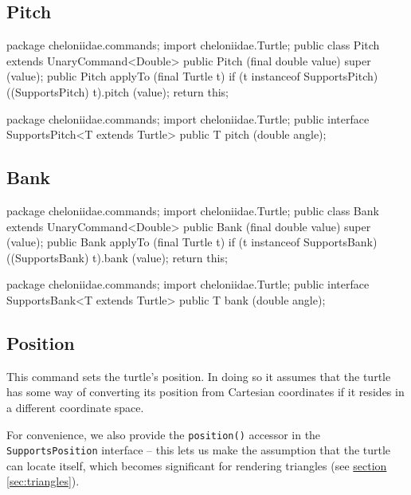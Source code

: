 \documentclass{report}
\newcommand{\Ref}[2]{\hyperref[#2]{#1 \ref*{#2}}}
\begin{document}
\subsection {Pitch} \label{sec:pitch}
\begin{javacode}
package cheloniidae.commands;
import cheloniidae.Turtle;
public class Pitch extends UnaryCommand<Double> {
  public Pitch (final double value) {super (value);}
  public Pitch applyTo (final Turtle t) {
    if (t instanceof SupportsPitch) ((SupportsPitch) t).pitch (value);
    return this;
  }
}
\end{javacode}

\begin{javacode}
package cheloniidae.commands;
import cheloniidae.Turtle;
public interface SupportsPitch<T extends Turtle> {
  public T pitch (double angle);
}
\end{javacode}

\subsection {Bank} \label{sec:bank}
\begin{javacode}
package cheloniidae.commands;
import cheloniidae.Turtle;
public class Bank extends UnaryCommand<Double> {
  public Bank (final double value) {super (value);}
  public Bank applyTo (final Turtle t) {
    if (t instanceof SupportsBank) ((SupportsBank) t).bank (value);
    return this;
  }
}
\end{javacode}

\begin{javacode}
package cheloniidae.commands;
import cheloniidae.Turtle;
public interface SupportsBank<T extends Turtle> {
  public T bank (double angle);
}
\end{javacode}

\subsection {Position} \label{sec:position}
        This command sets the turtle's position. In doing so it assumes that the turtle has some way of converting its position from Cartesian coordinates if it
        resides in a different coordinate space.

        For convenience, we also provide the {\tt position()} accessor in the {\tt SupportsPosition} interface -- this lets us make the assumption that the
        turtle can locate itself, which becomes significant for rendering triangles (see \Ref{section}{sec:triangles}).
\end{document}
